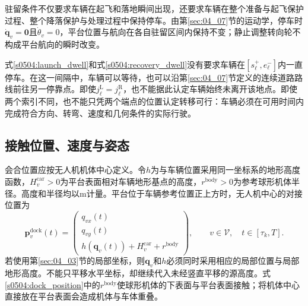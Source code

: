 驻留条件不仅要求车辆在起飞和落地瞬间出现，还要求车辆在整个准备与起飞保护过程、整个降落保护与处理过程中保持停车。由第\ref{sec:04_07}节的运动学，停车时$\dot{\mathbf q}_v=\mathbf0$且$\dot\theta_v=0$，平台位置与航向在各自驻留区间内保持不变；静止调整转向轮不构成平台航向的瞬时改变。

式\eqref{s0504:launch_dwell}和式\eqref{s0504:recovery_dwell}没有要求车辆在$[s_\ell^+,e_\ell^-]$内一直停车。在这一间隔中，车辆可以等待，也可以沿第\ref{sec:04_07}节定义的连续道路路线前往另一停靠点。即使$j_\ell^{\mathrm L}=j_\ell^{\mathrm R}$，也不能据此认定车辆始终未离开该地点。即使两个索引不同，也不能只凭两个端点的位置认定转移可行：车辆必须在可用时间内完成符合方向、转弯、速度和几何条件的实际行驶。

\subsection{接触位置、速度与姿态}

会合位置应按无人机机体中心定义。令$h$为与车辆位置采用同一坐标系的地形高度函数，$H_v^{\mathrm{car}}>0$为平台表面相对车辆地形基点的高度，$r^{\mathrm{body}}>0$为参考球形机体半径。高度和半径均以$\mathrm m$计量。平台位于车辆参考位置正上方时，无人机中心的对接位置为
\begin{equation}
 \mathbf p_v^{\mathrm{dock}}(t)=
 \begin{pmatrix}
 q_{vx}(t)\\
 q_{vy}(t)\\
 h(\mathbf q_v(t))+H_v^{\mathrm{car}}+r^{\mathrm{body}}
 \end{pmatrix},
 \qquad v\in\mathcal V,\quad t\in[\tau_k,T].
 \label{s0504:dock_position}
\end{equation}
若使用第\ref{sec:04_03}节的局部坐标，则$\mathbf q_v$和$h$必须同时采用相应的局部位置与局部地形高度。不能只平移水平坐标，却继续代入未经竖直平移的源高度。式\eqref{s0504:dock_position}中的$r^{\mathrm{body}}$使球形机体的下表面与平台表面接触；将机体中心直接放在平台表面会造成机体与车体重叠。

